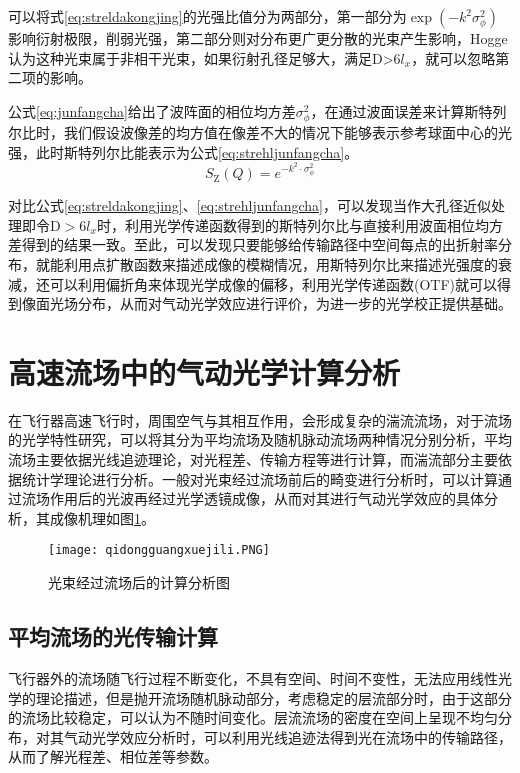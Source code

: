 可以将式\eqref{eq:streldakongjing}的光强比值分为两部分，第一部分为$\exp(-k^2\sigma_\phi^2)$影响衍射极限，削弱光强，第二部分则对分布更广更分散的光束产生影响，Hogge认为这种光束属于非相干光束，如果衍射孔径足够大，满足D>$6l_x$，就可以忽略第二项的影响。

公式\eqref{eq:junfangcha}给出了波阵面的相位均方差$\sigma_\phi^2$，在通过波面误差来计算斯特列尔比时，我们假设波像差的均方值在像差不大的情况下能够表示参考球面中心的光强，此时斯特列尔比能表示为公式\eqref{eq:strehljunfangcha}。
\begin{equation}
S_\text{Z}(Q)=e^{-k^2\cdot\sigma_\phi^2}
\label{eq:strehljunfangcha}
\end{equation}

对比公式\eqref{eq:streldakongjing}、\eqref{eq:strehljunfangcha}，可以发现当作大孔径近似处理即令D$>6l_x$时，利用光学传递函数得到的斯特列尔比与直接利用波面相位均方差得到的结果一致。至此，可以发现只要能够给传输路径中空间每点的出折射率分布，就能利用点扩散函数来描述成像的模糊情况，用斯特列尔比来描述光强度的衰减，还可以利用偏折角来体现光学成像的偏移，利用光学传递函数(OTF)就可以得到像面光场分布，从而对气动光学效应进行评价，为进一步的光学校正提供基础。
\section{高速流场中的气动光学计算分析}
在飞行器高速飞行时，周围空气与其相互作用，会形成复杂的湍流流场，对于流场的光学特性研究，可以将其分为平均流场及随机脉动流场两种情况分别分析，平均流场主要依据光线追迹理论，对光程差、传输方程等进行计算，而湍流部分主要依据统计学理论进行分析。一般对光束经过流场前后的畸变进行分析时，可以计算通过流场作用后的光波再经过光学透镜成像，从而对其进行气动光学效应的具体分析，其成像机理如图\ref{fig:qidongguangxuejisuanjili}。

\begin{figure}[bhtp]
\centering
\texttt{[image: qidongguangxuejili.PNG]}
\caption{光束经过流场后的计算分析图}
\label{fig:qidongguangxuejisuanjili}
\end{figure}
\subsection{平均流场的光传输计算}
飞行器外的流场随飞行过程不断变化，不具有空间、时间不变性，无法应用线性光学的理论描述，但是抛开流场随机脉动部分，考虑稳定的层流部分时，由于这部分的流场比较稳定，可以认为不随时间变化。层流流场的密度在空间上呈现不均匀分布，对其气动光学效应分析时，可以利用光线追迹法得到光在流场中的传输路径，从而了解光程差、相位差等参数。

